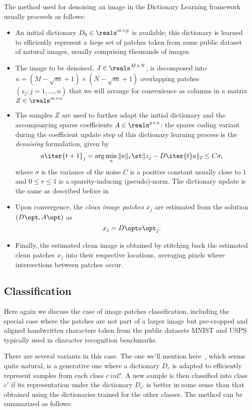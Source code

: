 \documentclass[a4paper,11pt]{article}
\begin{document}
The method used for denoising an image in the Dictionary Learning framework usually proceeds as follows:
\begin{itemize}
\item An initial dictionary $D_0 \in \reals^{m{\times}p}$ is available; this dictionary is learned to efficiently represent a \emph{large} set of patches taken from some public dataset of natural images, usually comprising thousands of images.
\item The image to be denoised, $J \in \reals^{M{\times}N}$, is decomposed into $n=(M-\sqrt{m}+1){\times}(N-\sqrt{m}+1)$ overlapping patches $(z_j : j = 1,\ldots,n)$ that we will arrange for convenience as columns in a matrix $Z \in \reals^{m{\times}n}$
\item The samples $Z$ are used to further adapt the initial dictionary and the accompanying sparse coefficients $A \in \reals^{p{\times}n}$; the sparse coding variant during the coefficient update step of this dictionary learning process is the \emph{denoising} formulation, given by
\[
a\iter{t+1}_j = \arg\min_a \|a\|_r \st \|z_j - D\iter{t}a \|_2 \leq C\sigma, 
\]
where $\sigma$ is the variance of the noise $C$ is a positive constant usually close to $1$ and $0 \leq r \leq 1$ is a sparsity-inducing (pseudo)-norm. The dictionary update is the same as described before in 
\item Upon convergence, the \emph{clean image patches $x_j$} are estimated from the solution $(D\opt,A\opt)$ as $$x_j = D\opt a\opt_j.$$
\item Finally, the estimated clean image is obtained by stitching back the estimated clean patches $x_j$ into their respective locations, averaging pixels where intersections between patches occur.
\end{itemize}

 
\subsection{Classification}

Here again we discuss the case of image patches classification, including the special case where the patches are not part of a larger image but pre-cropped and aligned handwritten characters taken from the public datasets MNIST and USPS typically used in character recognition benchmarks.

There are several variants in this case. The one we'll mention here~\cite{ramirez10cvpr}, which seems quite natural, is a generative one where a dictionary $D_c$ is  adapted to efficiently represent samples from each class $c  \ in \mathcal{C}$. A new sample is then classified into class $c'$ if its representation under the dictionary $D_{c'}$ is better in some sense than that obtained using the dictionaries trained for the other classes. The method  can be summarized as follows:
\end{document}
